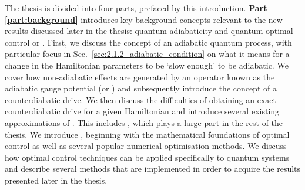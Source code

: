 The thesis is divided into four parts, prefaced by this introduction. \textbf{Part \ref{part:background}} introduces key background concepts relevant to the new results discussed later in the thesis: quantum adiabaticity and quantum optimal control or . First, we discuss the concept of an adiabatic quantum process, with particular focus in Sec.~\ref{sec:2.1.2_adiabatic_condition} on what it means for a change in the Hamiltonian parameters to be `slow enough' to be adiabatic. We cover how non-adiabatic effects are generated by an operator known as the adiabatic gauge potential (or ) and subsequently introduce the concept of a counterdiabatic drive. We then discuss the difficulties of obtaining an exact counterdiabatic drive for a given Hamiltonian and introduce several existing approximations of . This includes , which plays a large part in the rest of the thesis. We introduce , beginning with the mathematical foundations of optimal control as well as several popular numerical optimisation methods. We discuss how optimal control techniques can be applied specifically to quantum systems and describe several  methods that are implemented in order to acquire the results presented later in the thesis.

